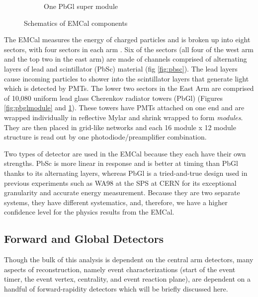 \begin{figure}
\begin{subfigure}[b]{0.6\textwidth}
    \caption{One PbGl super module}
\label{fig:pbglsupmodule}
\end{subfigure}
\caption[Schematics of EMCal components]{Schematics of EMCal components}
\label{fig:EMCalcomponents}
\end{figure}
\dsp

The EMCal measures the energy of charged particles and is broken up into eight sectors, with four sectors in each arm \citep{EMCfocus}. Six of the sectors (all four of the west arm and the top two in the east arm) are made of channels comprised of alternating layers of lead and scintillator (PbSc) material (fig \ref{fig:pbsc}). The lead layers cause incoming particles to shower into the scintillator layers that generate light which is detected by PMTs. The lower two sectors in the East Arm are comprised of 10,080 uniform lead glass Cherenkov radiator towers (PbGl) (Figures \ref{fig:pbglmodule} and \ref{fig:pbglsupmodule}). These towers have PMTs attached on one end and are wrapped individually in reflective Mylar and shrink wrapped to form \textit{modules}. They are then placed in grid-like networks and each 16 module x 12 module structure is read out by one photodiode/preamplifier combination. 

Two types of detector are used in the EMCal because they each have their own strengths. PbSc is more linear in response and is better at timing than PbGl thanks to its alternating layers, whereas PbGl is a tried-and-true design used in previous experiments such as WA98 at the SPS at CERN for its exceptional granularity and accurate energy measurement. Because they are two separate systems, they have different systematics, and, therefore, we have a higher confidence level for the physics results from the EMCal. 


\subsection{Forward and Global Detectors}
Though the bulk of this analysis is dependent on the central arm detectors, many aspects of reconstruction, namely event characterizations (start of the event timer, the event vertex, centrality, and event reaction plane), are dependent on a handful of forward-rapidity detectors which will be briefly discussed here.

